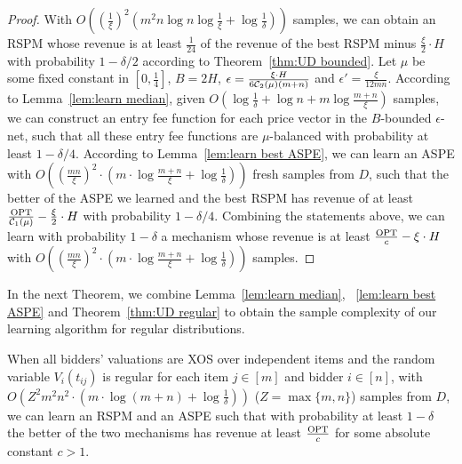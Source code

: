 \begin{proof}
With $O\left(\left(\frac{1}{\xi}\right)^2 \left(m^2 n\log n\log \frac{1}{\xi} + \log \frac{1}{\delta}\right)\right)$ samples, we can obtain an RSPM whose revenue is at least $\frac{1}{24}$ of the revenue of the best RSPM minus $\frac{\xi}{2}\cdot H$ with probability $1-\delta/2$ according to Theorem~\ref{thm:UD bounded}. 
Let $\mu$ be some fixed constant in $[0,\frac{1}{4}]$, $B=2H$, $\epsilon = \frac{\xi\cdot H}{6{\mathcal{C}}_2(\mu) (m+n)}$ and $\epsilon' = \frac{\xi}{12mn}$. 
According to Lemma~\ref{lem:learn median}, given $O\left(\log \frac{1}{\delta}+ \log n +m\log \frac{m+n}{\xi}\right)$ samples, we can construct an entry fee function for each price vector in the $B$-bounded $\epsilon$-net, such that all these entry fee functions are $\mu$-balanced with probability at least $1-\delta/4$.
 According to Lemma~\ref{lem:learn best ASPE}, we can learn an ASPE with $O\left(\left(\frac{mn}{\xi}\right)^2 \cdot \left(m\cdot\log \frac{m+n}{\xi} + \log \frac{1}{\delta}\right)\right)$ fresh samples from $D$, such that the better of the ASPE we learned and the best RSPM has revenue of at least $\frac{\text{OPT}}{{\mathcal{C}}_1(\mu)}-\frac{\xi}{2}\cdot H$ with probability $1-\delta/4$. Combining the statements above, we can learn with probability $1-\delta$ a mechanism whose revenue is at least $\frac{\text{OPT}}{c}-\xi\cdot H$ with $O\left(\left(\frac{mn}{\xi}\right)^2 \cdot \left(m\cdot\log \frac{m+n}{\xi} + \log \frac{1}{\delta}\right)\right)$ samples.
\end{proof}

In the next Theorem, we combine Lemma~\ref{lem:learn median}, ~\ref{lem:learn best ASPE} and Theorem~\ref{thm:UD regular} to obtain the sample complexity of our learning algorithm for regular distributions.

\begin{theorem}\label{thm:XOS regular}
	When all bidders' valuations are XOS over independent items and the random variable $V_i(t_{ij})$ is regular for each item $j\in[m]$ and bidder $i\in[n]$, with $O\left(Z^2m^2n^2 \cdot \left(m\cdot\log ({m+n}) + \log \frac{1}{\delta}\right)\right)$ ($Z=\max\{m,n\}$) samples from $D$, we can learn an RSPM and an ASPE such that with probability at least $1-\delta$ the better of the two mechanisms has revenue at least $\frac{\text{OPT}}{c}$ for some absolute constant $c>1$. %
\end{theorem}

